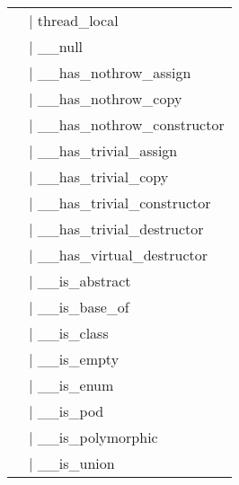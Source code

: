 \documentclass[a4paper]{article}
\begin{document}
\begin{tabular}{ll}
&$\mid$ thread\_local\\
&$\mid$ \_\_null\\
&$\mid$ \_\_has\_nothrow\_assign\\
&$\mid$ \_\_has\_nothrow\_copy\\
&$\mid$ \_\_has\_nothrow\_constructor\\
&$\mid$ \_\_has\_trivial\_assign\\
&$\mid$ \_\_has\_trivial\_copy\\
&$\mid$ \_\_has\_trivial\_constructor\\
&$\mid$ \_\_has\_trivial\_destructor\\
&$\mid$ \_\_has\_virtual\_destructor\\
&$\mid$ \_\_is\_abstract\\
&$\mid$ \_\_is\_base\_of\\
&$\mid$ \_\_is\_class\\
&$\mid$ \_\_is\_empty\\
&$\mid$ \_\_is\_enum\\
&$\mid$ \_\_is\_pod\\
&$\mid$ \_\_is\_polymorphic\\
&$\mid$ \_\_is\_union

\end{tabular}
\end{document}
